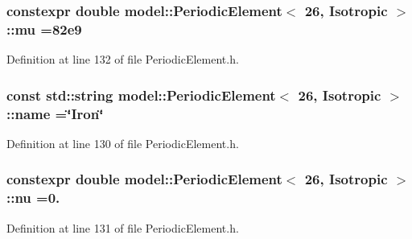 \subsubsection[{mu}]{\setlength{\rightskip}{0pt plus 5cm}constexpr double {\bf model\+::\+Periodic\+Element}$<$ 26, {\bf Isotropic} $>$\+::mu =82e9\hspace{0.3cm}{\ttfamily [static]}}\label{structmodel_1_1_periodic_element_3_0126_00_01_isotropic_01_4_aedee16b5777c60b48c584b6a1795c17b}


Definition at line 132 of file Periodic\+Element.\+h.

\hypertarget{structmodel_1_1_periodic_element_3_0126_00_01_isotropic_01_4_ad9f4b7c53a751ec9949c21c97651cde0}{}
\subsubsection[{name}]{\setlength{\rightskip}{0pt plus 5cm}const std\+::string {\bf model\+::\+Periodic\+Element}$<$ 26, {\bf Isotropic} $>$\+::name =\char`\"{}Iron\char`\"{}\hspace{0.3cm}{\ttfamily [static]}}\label{structmodel_1_1_periodic_element_3_0126_00_01_isotropic_01_4_ad9f4b7c53a751ec9949c21c97651cde0}


Definition at line 130 of file Periodic\+Element.\+h.

\hypertarget{structmodel_1_1_periodic_element_3_0126_00_01_isotropic_01_4_a33a164a02fadd727318a8c079e8374c7}{}
\subsubsection[{nu}]{\setlength{\rightskip}{0pt plus 5cm}constexpr double {\bf model\+::\+Periodic\+Element}$<$ 26, {\bf Isotropic} $>$\+::nu =0.\hspace{0.3cm}{\ttfamily [static]}}\label{structmodel_1_1_periodic_element_3_0126_00_01_isotropic_01_4_a33a164a02fadd727318a8c079e8374c7}


Definition at line 131 of file Periodic\+Element.\+h.

\hypertarget{structmodel_1_1_periodic_element_3_0126_00_01_isotropic_01_4_afba3b66bcbb50471a1a5cf9fb6589dcd}{}

